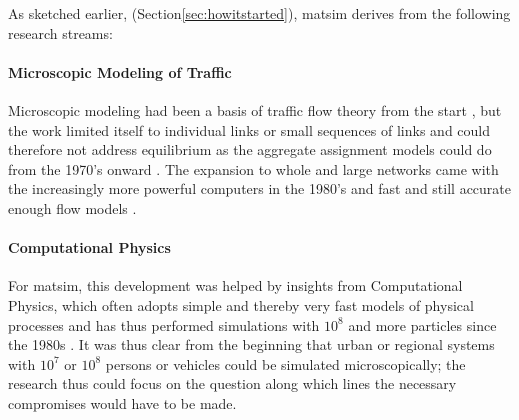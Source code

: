 As sketched earlier, 
(Section\ref{sec:howitstarted}),
\gls{matsim} derives from the following research streams:

\paragraph{Microscopic Modeling of Traffic} 
Microscopic modeling had been 
a basis of traffic flow 
theory from the start 
\citep[e.g.,][]{theGang,Seddon_Simulation_1972,Wiedemann_PhDThesis_1974}, but the work 
limited itself to individual links or small sequences of links and could therefore not address equilibrium as the aggregate assignment models could do from the 1970’s onward \citep[see][]{Sheffi_1985,OrtuzarWillumsen_2011}. The expansion to whole and large networks came with the increasingly more powerful computers in the 1980’s and fast and still accurate enough flow models \citep[e.g.,][]{Schwerdtfeger_VolmulerHamerslag_1984, NagelSchreckenberg1992CA, Daganzo_TransResPartB_1994,Gawron_IJMPC_1998}.

\paragraph{Computational Physics} 
For \gls{matsim}, this development was helped by insights from Computational Physics, which often adopts simple and thereby very fast models of physical processes and has thus performed simulations with $10^8$ and more particles since the 1980s \citep[for a contemporary review see][]{BeazleyEtcMolec-dyn}.
It was thus clear from the beginning that urban or regional systems with $10^7$ or $10^8$ persons or vehicles could be simulated microscopically; the research thus could focus on the question along which lines the necessary compromises would have to be made.

